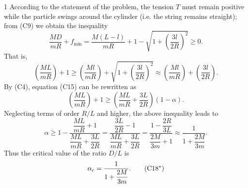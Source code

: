 \begin{solution}{1}
According to the statement of the problem, the tension $T$ must remain positive while the particle swings around the cylinder (i.e. the string remains straight); from (C9) we obtain the inequality
\begin{equation}
\frac{MD}{mR}+f_{\min}=\frac{M(L-l)}{mR}+1-\sqrt{1+\left(\frac{3l}{2R}\right)^2}\ge 0 . \tag{C14}
\end{equation}
That is,
\begin{equation}
\left(\frac{ML}{mR}\right)+1\ge \left(\frac{Ml}{mR}\right)+\sqrt{1+\left(\frac{3l}{2R}\right)^2}
\approx \left(\frac{Ml}{mR}\right)+\left(\frac{3l}{2R}\right). \tag{C15}
\end{equation}
By (C4), equation (C15) can be rewritten as
\begin{equation}
\left(\frac{ML}{mR}\right)+1\ge \left(\frac{ML}{mR}+\frac{3L}{2R}\right)(1-\alpha). \tag{C16}
\end{equation}
Neglecting terms of order $R/L$ and higher, the above inequality leads to
\begin{equation}
\alpha\ge 1-\frac{\dfrac{ML}{mR}+1}{\dfrac{ML}{mR}+\dfrac{3L}{2R}}
=\frac{\dfrac{3L}{2R}-1}{\dfrac{ML}{mR}+\dfrac{3L}{2R}}
=\frac{1-\dfrac{2R}{3L}}{\dfrac{2M}{3m}+1}
\approx \frac{1}{1+\dfrac{2M}{3m}} . \tag{C17}
\end{equation}
Thus the critical value of the ratio $D/L$ is
\begin{equation}
\alpha_c=\frac{1}{1+\dfrac{2M}{3m}} . \tag{C18$^{*}$}
\end{equation}

\end{solution}

